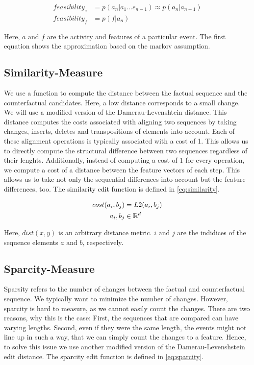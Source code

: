\documentclass[./../../paper.tex]{subfiles}
\begin{document}
\begin{align}
    \label{eq:feasibility}
    feasibility_e & =p(a_n|a_1\ldots e_{n-1}) \approx  p(a_n|a_{n-1}) \\
    feasibility_f & =p(f|a_n)
\end{align}

\noindent Here, $a \text{ and } f$ are the activity and features of a particular event. The first equation shows the approximation based on the markov assumption.

\subsection{Similarity-Measure}
We use a function to compute the distance between the factual sequence and the counterfactual candidates. Here, a low distance corresponds to a small change. We will use a modified version of the Damerau-Levenshtein distance. This distance computes the costs associated with aligning two sequences by taking changes, inserts, deletes and transpositions of elements into account. Each of these alignment operations is typically associated with a cost of 1. This allows us to directly compute the structural difference between two sequences regardless of their lenghts. Additionally, instead of computing a cost of 1 for every operation, we compute a cost of a distance between the feature vectors of each step. This allows us to take not only the sequential differences into account but the feature differences, too. The similarity edit function is defined in \autoref{eq:similarity}.

\begin{align}
    \label{eq:similarity}
    cost(a_i, b_j)      & = L2(a_i, b_j) \\
    a_i,b_j        & \in \mathbb{R}^d
\end{align}

\noindent Here, $dist(x,y)$ is an arbitrary distance metric. $i \text{ and } j$ are the indidices of the sequence elements $a \text{ and } b$, respectively.

\subsection{Sparcity-Measure}
Sparsity refers to the number of changes between the factual and counterfactual sequence. We typically want to minimize the number of changes. However, sparcity is hard to measure, as we cannot easily count the changes. There are two reasons, why this is the case: First, the sequences that are compared can have varying lengths. Second, even if they were the same length, the events might not line up in such a way, that we can simply count the changes to a feature. Hence, to solve this issue we use another modified version of the Damerau-Levenshstein edit distance. The sparcity edit function is defined in \autoref{eq:sparcity}.
\end{document}
